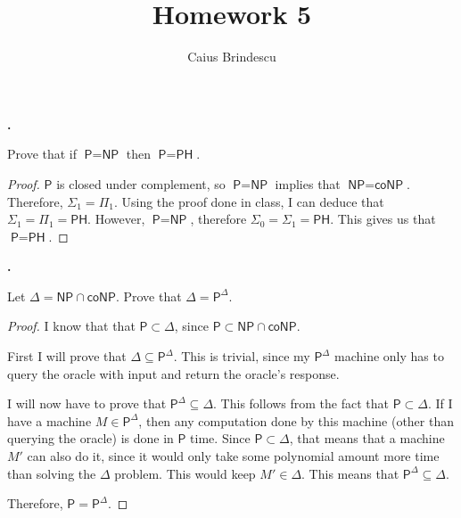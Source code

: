 \documentclass[letterpaper,11pt]{article}
\title{Homework 5}
\author{Caius Brindescu}
\newcommand{\cc}[1]{\ensuremath{\textsf{#1}}\xspace}
\renewcommand{\P}{\cc{P}}
\newcommand{\NP}{\cc{NP}}
\newcommand{\coNP}{\cc{coNP}}
\newcommand{\PH}{\cc{PH}}
\newcounter{problem}
\newenvironment{problem}%
{%
	\stepcounter{problem}%
	\textbf{\theproblem.}
	\large
}{\\}%
\begin{document}
\maketitle

\begin{problem}
Prove that if $\P = \NP$ then $\P = \PH$.
\end{problem}


\begin{proof}


$\P$ is closed under complement, so $\P = \NP$ implies that $\NP = \coNP$. 
Therefore, $\Sigma_1 = \Pi_1$. 
Using the proof done in class, I can deduce that $\Sigma_1 = \Pi_1 = \PH$.
However, $\P = \NP$, therefore $\Sigma_0 = \Sigma_1 = \PH$.
This gives us that $\P = \PH$.
\end{proof}

\begin{problem}
Let $\Delta = \NP \cap \coNP$. Prove that $\Delta = \P^\Delta$.
\end{problem}


\begin{proof}
I know that that $\P \subset \Delta$, since $\P \subset \NP \cap \coNP$.

First I will prove that $\Delta \subseteq \P^\Delta$.
This is trivial, since my $\P^\Delta$ machine only has to query the oracle with input and return the oracle's response.

I will now have to prove that $\P^\Delta \subseteq \Delta$. 
This follows from the fact that $\P \subset \Delta$. 
If I have a machine $M \in \P^\Delta$, then any computation done by this machine (other than querying the oracle) is done in $\P$ time.
Since $\P \subset \Delta$, that means that a machine $M'$ can also do it, since it would only take some polynomial amount more time than solving the $\Delta$ problem. 
This would keep $M' \in \Delta$.
This means that $\P^\Delta \subseteq \Delta$.

Therefore, $\P = \P^\Delta$.
\end{proof}
\end{document}
